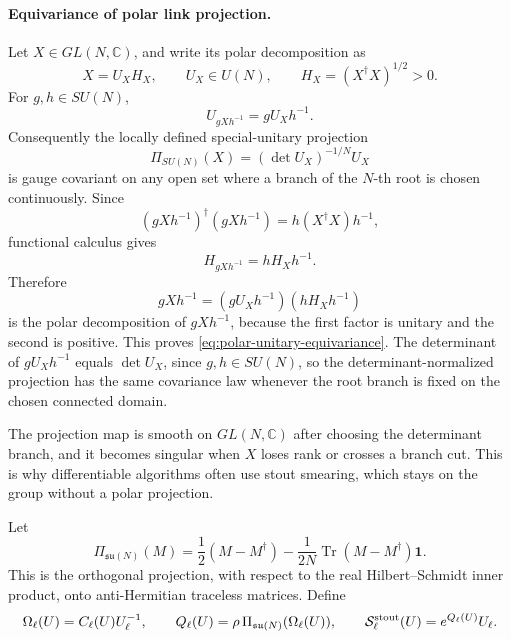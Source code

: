 \paragraph{Equivariance of polar link projection.}
Let \(X\in GL(N,\mathbb C)\), and write its polar decomposition as
\[
  X=U_XH_X,\qquad
  U_X\in U(N),\qquad H_X=(X^\dagger X)^{1/2}>0.
\]
For \(g,h\in SU(N)\),
\begin{equation}
  U_{gXh^{-1}}=gU_Xh^{-1}.
  \label{eq:polar-unitary-equivariance}
\end{equation}
Consequently the locally defined special-unitary projection
\begin{equation}
  \Pi_{SU(N)}(X)
  =
  (\det U_X)^{-1/N}U_X
  \label{eq:suN-polar-projection}
\end{equation}
is gauge covariant on any open set where a branch of the \(N\)-th root is
chosen continuously.
Since
\[
  (gXh^{-1})^\dagger(gXh^{-1})
  =
  h(X^\dagger X)h^{-1},
\]
functional calculus gives
\[
  H_{gXh^{-1}}=hH_Xh^{-1}.
\]
Therefore
\[
  gXh^{-1}
  =
  (gU_Xh^{-1})(hH_Xh^{-1})
\]
is the polar decomposition of \(gXh^{-1}\), because the first factor is
unitary and the second is positive.  This proves
\eqref{eq:polar-unitary-equivariance}.  The determinant of \(gU_Xh^{-1}\)
equals \(\det U_X\), since \(g,h\in SU(N)\), so the determinant-normalized
projection has the same covariance law whenever the root branch is fixed on
the chosen connected domain.

The projection map is smooth on \(GL(N,\mathbb C)\) after choosing the
determinant branch, and it becomes singular when \(X\) loses rank or crosses
a branch cut.  This is why differentiable algorithms often use stout
smearing, which stays on the group without a polar projection.

Let
\begin{equation}
  \Pi_{\mathfrak{su}(N)}(M)
  =
  \frac12(M-M^\dagger)
  -
  \frac{1}{2N}\operatorname{Tr}(M-M^\dagger)\mathbf 1 .
  \label{eq:suN-algebra-projection}
\end{equation}
This is the orthogonal projection, with respect to the real Hilbert--Schmidt
inner product, onto anti-Hermitian traceless matrices.  Define
\begin{equation}
  \Omega_\ell(U)=C_\ell(U)U_\ell^{-1},
  \qquad
  Q_\ell(U)=\rho\,\Pi_{\mathfrak{su}(N)}(\Omega_\ell(U)),
  \qquad
  \mathcal S_\ell^{\rm stout}(U)=e^{Q_\ell(U)}U_\ell .
  \label{eq:stout-smearing-definition}
\end{equation}


